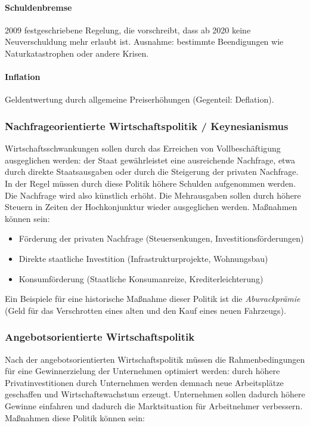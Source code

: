 \documentclass{article}
\begin{document}
	\paragraph{Schuldenbremse}
	2009 festgeschriebene Regelung, die vorschreibt, dass ab 2020 keine Neuverschuldung mehr erlaubt ist. Ausnahme: bestimmte Beendigungen wie Naturkatastrophen oder andere Krisen.

	\paragraph{Inflation}
	Geldentwertung durch allgemeine Preiserhöhungen (Gegenteil: Deflation).

	\subsubsection{Nachfrageorientierte Wirtschaftspolitik / Keynesianismus}
	Wirtschaftsschwankungen sollen durch das Erreichen von Vollbeschäftigung ausgeglichen werden: der Staat gewährleistet eine ausreichende Nachfrage, etwa durch direkte Staatsausgaben oder durch die Steigerung der privaten Nachfrage. In der Regel müssen durch diese Politik höhere Schulden aufgenommen werden. Die Nachfrage wird also künstlich erhöht. Die Mehrausgaben sollen durch höhere Steuern in Zeiten der Hochkonjunktur wieder ausgeglichen werden. Maßnahmen können sein:

	\begin{itemize}
		\item Förderung der privaten Nachfrage (Steuersenkungen, Investitionsförderungen)
		\item Direkte staatliche Investition (Infrastrukturprojekte, Wohnungsbau)
		\item Konsumförderung (Staatliche Konsumanreize, Krediterleichterung) 
	\end{itemize}

	Ein Beispiele für eine historische Maßnahme dieser Politik ist die \textit{Abwrackprämie} (Geld für das Verschrotten eines alten und den Kauf eines neuen Fahrzeugs).

	\subsubsection{Angebotsorientierte Wirtschaftspolitik}
	Nach der angebotsorientierten Wirtschaftspolitik müssen die Rahmenbedingungen für eine Gewinnerzielung der Unternehmen optimiert werden: durch höhere Privatinvestitionen durch Unternehmen werden demnach neue Arbeitsplätze geschaffen und Wirtschaftswachstum erzeugt. Unternehmen sollen dadurch höhere Gewinne einfahren und dadurch die Marktsituation für Arbeitnehmer verbessern. Maßnahmen diese Politik können sein:
\end{document}
